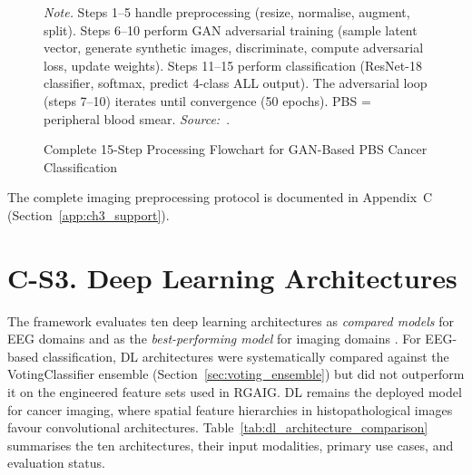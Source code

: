 \begin{figure}[!htbp]
{%
}
\caption[GAN Processing Flowchart]{Complete 15-Step Processing Flowchart for GAN-Based PBS Cancer Classification}
\vspace{0.5em}
\noindent\textit{Note.} Steps 1--5 handle preprocessing (resize, normalise, augment, split). Steps 6--10 perform GAN adversarial training (sample latent vector, generate synthetic images, discriminate, compute adversarial loss, update weights). Steps 11--15 perform classification (ResNet-18 classifier, softmax, predict 4-class ALL output). The adversarial loop (steps 7--10) iterates until convergence (50 epochs). PBS = peripheral blood smear. \textit{Source:}~\cite{asthana2025cancer}.
\end{figure}
\fi %

\fi %



The complete imaging preprocessing protocol is documented in Appendix~C (Section~\ref{app:ch3_support}).


\section*{C-S3. Deep Learning Architectures}
\label{sec:appc_dl_arch}
\iffalse %

The framework evaluates ten deep learning architectures as \textit{compared models} for EEG domains and as the \textit{best-performing model} for imaging domains . For EEG-based classification, DL architectures were systematically compared against the VotingClassifier ensemble (Section~\ref{sec:voting_ensemble}) but did not outperform it on the engineered feature sets used in RGAIG. DL remains the deployed model for cancer imaging, where spatial feature hierarchies in histopathological images favour convolutional architectures. Table~\ref{tab:dl_architecture_comparison} summarises the ten architectures, their input modalities, primary use cases, and evaluation status.


